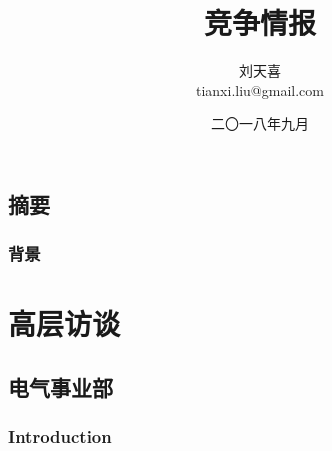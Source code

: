 \documentclass[UTF8,12pt,a4paper]{ctexbook}
\title{竞争情报}
\author{刘天喜 \\ tianxi.liu@gmail.com}
\date{二〇一八年九月}
\begin{document}
\maketitle
\tableofcontents

\chapter*{摘要}

\section{背景}


\part{高层访谈}

\chapter{电气事业部}

\section{Introduction}
\end{document}
